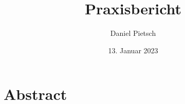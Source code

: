 \documentclass[a4paper, 11pt]{article}
\title{Praxisbericht}
\author{Daniel Pietsch}
\date{13. Januar 2023}
\begin{document}
\section{Abstract}
\end{document}
